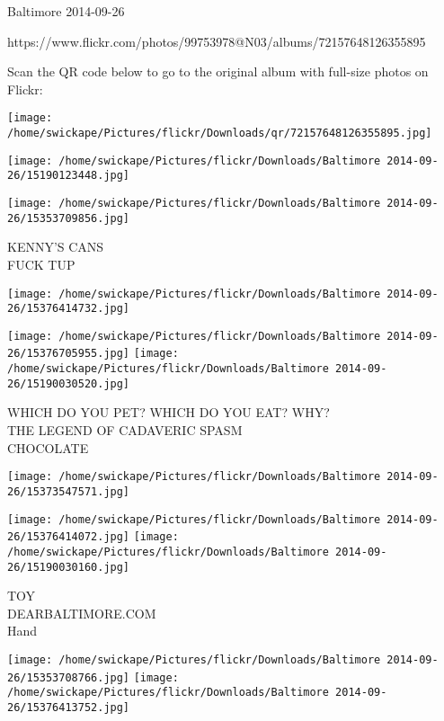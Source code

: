 \documentclass[10pt,letterpaper]{article}
\begin{document}
Baltimore 2014-09-26

https://www.flickr.com/photos/99753978@N03/albums/72157648126355895

Scan the QR code below to go to the original album with full-size photos on Flickr:

\texttt{[image: /home/swickape/Pictures/flickr/Downloads/qr/72157648126355895.jpg]}
\pagebreak

\texttt{[image: /home/swickape/Pictures/flickr/Downloads/Baltimore 2014-09-26/15190123448.jpg]}

\vspace{0.25in}
\texttt{[image: /home/swickape/Pictures/flickr/Downloads/Baltimore 2014-09-26/15353709856.jpg]}

KENNY'S CANS\\
FUCK TUP\\
\pagebreak

\texttt{[image: /home/swickape/Pictures/flickr/Downloads/Baltimore 2014-09-26/15376414732.jpg]}

\vspace{0.25in}
\texttt{[image: /home/swickape/Pictures/flickr/Downloads/Baltimore 2014-09-26/15376705955.jpg]}
\texttt{[image: /home/swickape/Pictures/flickr/Downloads/Baltimore 2014-09-26/15190030520.jpg]}

WHICH DO YOU PET?  WHICH DO YOU EAT?  WHY?\\
THE LEGEND OF CADAVERIC SPASM\\
CHOCOLATE\\
\pagebreak

\texttt{[image: /home/swickape/Pictures/flickr/Downloads/Baltimore 2014-09-26/15373547571.jpg]}

\vspace{0.25in}
\texttt{[image: /home/swickape/Pictures/flickr/Downloads/Baltimore 2014-09-26/15376414072.jpg]}
\texttt{[image: /home/swickape/Pictures/flickr/Downloads/Baltimore 2014-09-26/15190030160.jpg]}

TOY\\
DEARBALTIMORE.COM\\
Hand\\
\pagebreak

\texttt{[image: /home/swickape/Pictures/flickr/Downloads/Baltimore 2014-09-26/15353708766.jpg]}
\texttt{[image: /home/swickape/Pictures/flickr/Downloads/Baltimore 2014-09-26/15376413752.jpg]}
\end{document}
